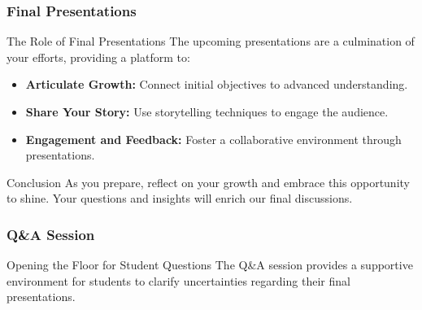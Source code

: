 \documentclass[aspectratio=169]{beamer}
\begin{document}
\begin{frame}[fragile]
    \frametitle{Final Presentations}
    \begin{block}{The Role of Final Presentations}
        The upcoming presentations are a culmination of your efforts, providing a platform to:
        \begin{itemize}
            \item \textbf{Articulate Growth:} Connect initial objectives to advanced understanding.
            \item \textbf{Share Your Story:} Use storytelling techniques to engage the audience.
            \item \textbf{Engagement and Feedback:} Foster a collaborative environment through presentations.
        \end{itemize}
    \end{block}

    \begin{block}{Conclusion}
        As you prepare, reflect on your growth and embrace this opportunity to shine. Your questions and insights will enrich our final discussions.
    \end{block}
\end{frame}

\begin{frame}[fragile]
    \frametitle{Q\&A Session}
    \begin{block}{Opening the Floor for Student Questions}
        The Q\&A session provides a supportive environment for students to clarify uncertainties regarding their final presentations.
    \end{block}
\end{frame}
\end{document}

